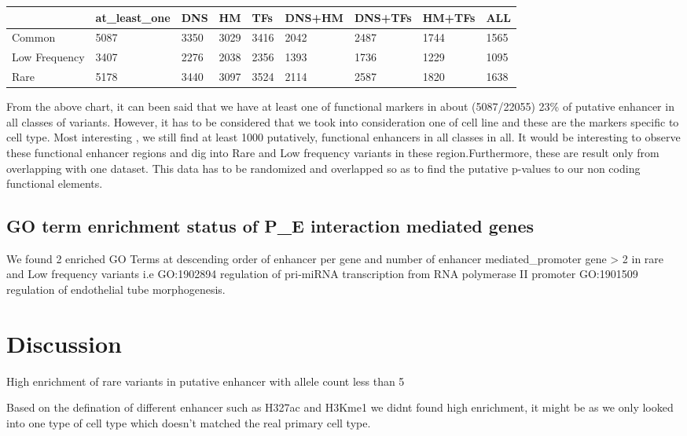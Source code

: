 \documentclass[11pt]{article} %
\begin{document}
\begin{table}[H]
\centering
\label{my-label}
\begin{tabular}{@{}lllllllll@{}}
\toprule
\rowcolor[HTML]{BBDAFF} 
\multicolumn{1}{c}{\cellcolor[HTML]{BBDAFF}{\color[HTML]{333333} class}} & {\color[HTML]{333333} at\_least\_one} & {\color[HTML]{333333} DNS} & {\color[HTML]{333333} HM} & {\color[HTML]{333333} TFs} & {\color[HTML]{333333} DNS+HM} & {\color[HTML]{333333} DNS+TFs} & {\color[HTML]{333333} HM+TFs} & {\color[HTML]{333333} ALL} \\ \midrule
\cellcolor[HTML]{FFFFFF}Common & 5087 & 3350 & 3029 & 3416 & 2042 & 2487 & 1744 & 1565 \\
\cellcolor[HTML]{FFFFFF}Low Frequency & 3407 & 2276 & 2038 & 2356 & 1393 & 1736 & 1229 & 1095 \\
\cellcolor[HTML]{FFFFFF}Rare & 5178 & 3440 & 3097 & 3524 & 2114 & 2587 & 1820 & 1638 \\ \bottomrule
\end{tabular}
\end{table}

From the above chart, it can been said that we have at least one of functional markers in about (5087/22055) 23\% of putative enhancer in all classes of variants. However, it has to be considered that we took into consideration one of cell line and these are the markers specific to cell type. Most interesting , we still find at least 1000 putatively, functional enhancers in all classes in all. It would be interesting to observe these functional enhancer regions and dig into Rare and Low frequency variants in these region.Furthermore, these are result only from overlapping with one dataset. This data has to be randomized and overlapped so as to find the putative p-values to our non coding functional elements.

\subsection{GO term enrichment status of P\_E interaction mediated genes}


We found 2 enriched GO Terms at descending order of enhancer per gene and number of enhancer mediated\_promoter gene \textgreater{} 2 in rare and Low frequency variants i.e GO:1902894 regulation of pri-miRNA
transcription from RNA polymerase II promoter GO:1901509 regulation of
endothelial tube morphogenesis.

\section{Discussion}


High enrichment of rare variants in putative enhancer with allele count
less than 5

Based on the defination of different enhancer such as H327ac and H3Kme1
we didnt found high enrichment, it might be as we only looked into one
type of cell type which doesn't matched the real primary cell type.

\newpage


\end{document}
